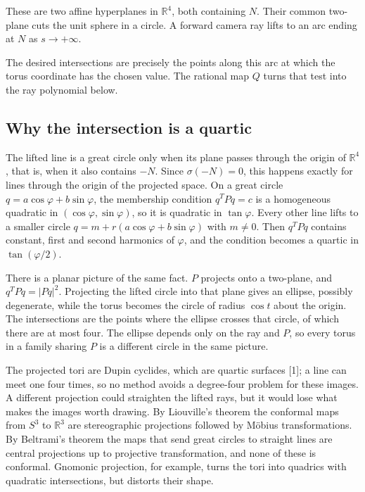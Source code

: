 \documentclass[11pt,a4paper]{article}
\begin{document}
These are two affine hyperplanes in \(\mathbb R^4\), both containing
\(N\). Their common two-plane cuts the unit sphere in a circle. A
forward camera ray lifts to an arc ending at \(N\) as \(s\to+\infty\).

The desired intersections are precisely the points along this arc at
which the torus coordinate has the chosen value. The rational map \(Q\)
turns that test into the ray polynomial below.

\subsection{Why the intersection is a
quartic}\label{why-the-intersection-is-a-quartic}

The lifted line is a great circle only when its plane passes through the
origin of \(\mathbb R^4\), that is, when it also contains \(-N\). Since
\(\sigma(-N)=0\), this happens exactly for lines through the origin of
the projected space. On a great circle \(q=a\cos\varphi+b\sin\varphi\),
the membership condition \(q^TPq=c\) is a homogeneous quadratic in
\((\cos\varphi,\sin\varphi)\), so it is quadratic in \(\tan\varphi\).
Every other line lifts to a smaller circle
\(q=m+r(a\cos\varphi+b\sin\varphi)\) with \(m\neq0\). Then \(q^TPq\)
contains constant, first and second harmonics of \(\varphi\), and the
condition becomes a quartic in \(\tan(\varphi/2)\).

There is a planar picture of the same fact. \(P\) projects onto a
two-plane, and \(q^TPq=|Pq|^2\). Projecting the lifted circle into that
plane gives an ellipse, possibly degenerate, while the torus becomes the
circle of radius \(\cos t\) about the origin. The intersections are the
points where the ellipse crosses that circle, of which there are at most
four. The ellipse depends only on the ray and \(P\), so every torus in a
family sharing \(P\) is a different circle in the same picture.

The projected tori are Dupin cyclides, which are quartic surfaces
{[}1{]}; a line can meet one four times, so no method avoids a
degree-four problem for these images. A different projection could
straighten the lifted rays, but it would lose what makes the images
worth drawing. By Liouville's theorem the conformal maps from \(S^3\) to
\(\mathbb R^3\) are stereographic projections followed by Möbius
transformations. By Beltrami's theorem the maps that send great circles
to straight lines are central projections up to projective
transformation, and none of these is conformal. Gnomonic projection, for
example, turns the tori into quadrics with quadratic intersections, but
distorts their shape.
\end{document}
